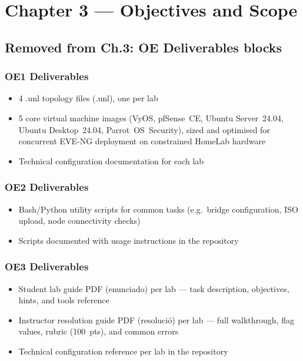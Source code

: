 \documentclass[a4paper,11pt]{article}
\begin{document}
\section{Chapter 3 --- Objectives and Scope}

\subsection{Removed from Ch.3: OE Deliverables blocks}


\subsubsection{OE1 Deliverables}
\begin{itemize}
\item 4 .unl topology files (.unl), one per lab
\item 5 core virtual machine images (VyOS, pfSense~CE, Ubuntu Server~24.04,
      Ubuntu Desktop~24.04, Parrot~OS~Security), sized and optimised for
      concurrent EVE-NG deployment on constrained HomeLab hardware
\item Technical configuration documentation for each lab
\end{itemize}

\subsubsection{OE2 Deliverables}
\begin{itemize}
\item Bash/Python utility scripts for common tasks (e.g.\ bridge configuration,
      ISO upload, node connectivity checks)
\item Scripts documented with usage instructions in the repository
\end{itemize}

\subsubsection{OE3 Deliverables}
\begin{itemize}
\item Student lab guide PDF (enunciado) per lab --- task description, objectives,
      hints, and tools reference
\item Instructor resolution guide PDF (resolució) per lab --- full walkthrough,
      flag values, rubric (100~pts), and common errors
\item Technical configuration reference per lab in the repository
\end{itemize}
\end{document}
